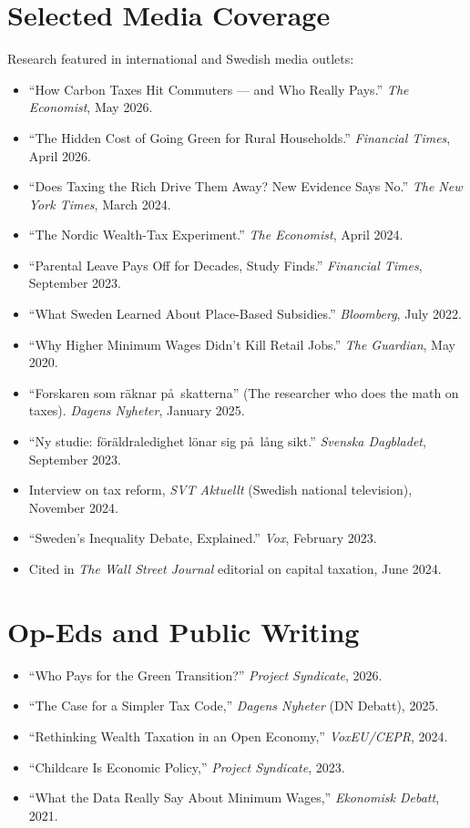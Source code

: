 \documentclass[11pt]{article}
\newcommand{\NEW}[1]{\textcolor{newgreen}{#1}}%
\newcommand{\NEW}[1]{#1}%
\begin{document}
\section{Selected Media Coverage}
Research featured in international and Swedish media outlets:
\begin{itemize}
\item \NEW{``How Carbon Taxes Hit Commuters --- and Who Really Pays.'' \emph{The Economist}, May 2026.}
\item \NEW{``The Hidden Cost of Going Green for Rural Households.'' \emph{Financial Times}, April 2026.}
\item ``Does Taxing the Rich Drive Them Away? New Evidence Says No.'' \emph{The New York Times}, March 2024.
\item ``The Nordic Wealth-Tax Experiment.'' \emph{The Economist}, April 2024.
\item ``Parental Leave Pays Off for Decades, Study Finds.'' \emph{Financial Times}, September 2023.
\item ``What Sweden Learned About Place-Based Subsidies.'' \emph{Bloomberg}, July 2022.
\item ``Why Higher Minimum Wages Didn't Kill Retail Jobs.'' \emph{The Guardian}, May 2020.
\item ``Forskaren som r\"aknar p\aa\ skatterna'' (The researcher who does the math on taxes). \emph{Dagens Nyheter}, January 2025.
\item ``Ny studie: f\"or\"aldraledighet l\"onar sig p\aa\ l\aa ng sikt.'' \emph{Svenska Dagbladet}, September 2023.
\item Interview on tax reform, \emph{SVT Aktuellt} (Swedish national television), November 2024.
\item ``Sweden's Inequality Debate, Explained.'' \emph{Vox}, February 2023.
\item Cited in \emph{The Wall Street Journal} editorial on capital taxation, June 2024.
\end{itemize}

\section{Op-Eds and Public Writing}
\begin{itemize}
\item \NEW{``Who Pays for the Green Transition?'' \emph{Project Syndicate}, 2026.}
\item ``The Case for a Simpler Tax Code,'' \emph{Dagens Nyheter} (DN Debatt), 2025.
\item ``Rethinking Wealth Taxation in an Open Economy,'' \emph{VoxEU/CEPR}, 2024.
\item ``Childcare Is Economic Policy,'' \emph{Project Syndicate}, 2023.
\item ``What the Data Really Say About Minimum Wages,'' \emph{Ekonomisk Debatt}, 2021.
\end{itemize}
\end{document}
